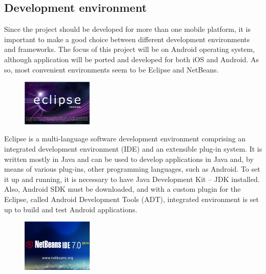 \pagebreak
\subsection{Development environment}

Since the project should be developed for more than one mobile platform, it is important to make a good choice between different development environments and frameworks. The focus of this project will be on Android operating system, although application will be ported and developed for both iOS and Android.
As so, most convenient environments seem to be Eclipse and NetBeans.\newline

\begin{figure}[htb]
	\centering
	\includegraphics[width=0.3\textwidth]{prestudy/development_environment/Eclipse.png}
	\label{fig:Eclipse Indigo}
\end{figure}
	
Eclipse is a multi-language software development environment comprising an integrated development environment (IDE) and an extensible plug-in system. It is written mostly in Java and can be used to develop applications in Java and, by means of various plug-ins, other programming languages, such as Android. 
To set it up and running, it is necessary to have Java Development Kit – JDK installed. Also, Android SDK must be downloaded, and with a custom plugin for the Eclipse, called Android Development Tools (ADT), integrated environment is set up to build and test Android applications.\newline

\begin{figure}[htb]
	\centering
	\includegraphics[width=0.3\textwidth]{prestudy/development_environment/netBeans.png}
	\label{fig:NetBeans}
	\label{fig:NetBeans}
\end{figure}


